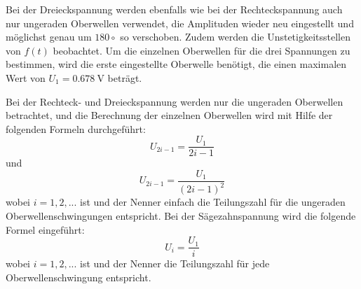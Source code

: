Bei der Dreieckspannung werden ebenfalls wie bei der Rechteckspannung auch nur ungeraden Oberwellen verwendet, die Amplituden wieder neu eingestellt und möglichst genau um $180\si{\circ}$ so verschoben.
Zudem werden die Unstetigkeitsstellen von $f(t)$ beobachtet.
Um die einzelnen Oberwellen für die drei Spannungen zu bestimmen, wird die erste eingestellte Oberwelle benötigt, die einen maximalen Wert von $U_{1} = \SI{0,678}{\volt}$ beträgt.

Bei der Rechteck- und Dreieckspannung werden nur die ungeraden Oberwellen betrachtet, und die Berechnung der einzelnen Oberwellen wird mit Hilfe der folgenden Formeln durchgeführt:
\begin{equation}
\label{eqn:Spannungungerade}
U_{2i-1} = \frac{U_{1}}{2i-1}
\end{equation}
und 
\begin{equation}
\label{eqn:SpannungDreieck}
U_{2i-1} = \frac{U_{1}}{(2i-1)^2}
\end{equation}
wobei $i = 1, 2, ...$ ist und der Nenner einfach die Teilungszahl für die ungeraden Oberwellenschwingungen entspricht. 
Bei der Sägezahnspannung wird die folgende Formel eingeführt:
\begin{equation}
\label{eqn:Spannungalle}
U_{i} = \frac{U_1}{i}
\end{equation}
wobei $i = 1, 2, ...$ ist und der Nenner die Teilungszahl für jede Oberwellenschwingung entspricht. 